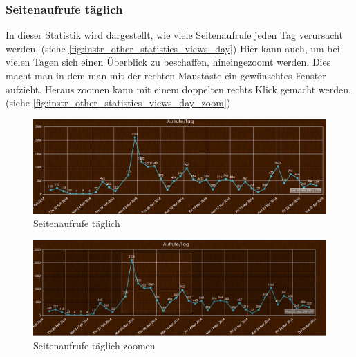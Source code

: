 \subsubsection{Seitenaufrufe täglich}
In dieser Statistik wird dargestellt, wie viele Seitenaufrufe jeden Tag verursacht werden. (siehe \autoref{fig:instr_other_statistics_views_day}) Hier kann auch, um bei vielen Tagen sich einen Überblick zu beschaffen, hineingezoomt werden. Dies macht man in dem man mit der rechten Maustaste ein gewünschtes Fenster aufzieht. Heraus zoomen kann mit einem doppelten rechts Klick gemacht werden. (siehe \autoref{fig:instr_other_statistics_views_day_zoom})
\begin{figure}[H]
\centering
\includegraphics[keepaspectratio=true, width=17cm]{images/screenshots/statistics_views_day.png}
\caption{Seitenaufrufe täglich}
\label{fig:instr_other_statistics_views_day}
\end{figure}
\begin{figure}[H]
\centering
\includegraphics[keepaspectratio=true, width=17cm]{images/screenshots/statistics_views_day_zoom.png}
\caption{Seitenaufrufe täglich zoomen}
\label{fig:instr_other_statistics_views_day_zoom}
\end{figure}
